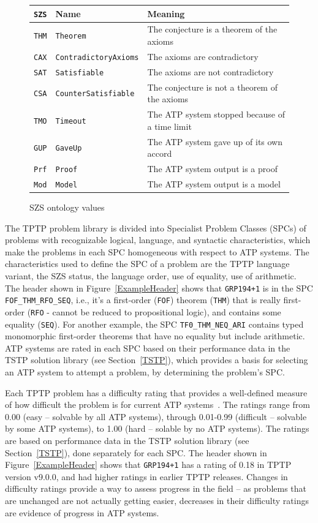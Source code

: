\documentclass[runningheads]{llncs}
\begin{document}
\begin{figure}[htb]
\centering
\begin{tabular}{lll}
{\tt SZS} & Name                      & Meaning \\
\hline
{\tt THM} & {\tt Theorem}             & The conjecture is a theorem of the axioms \\
{\tt CAX} & {\tt ContradictoryAxioms} & The axioms are contradictory \\
{\tt SAT} & {\tt Satisfiable}         & The axioms are not contradictory \\
{\tt CSA} & {\tt CounterSatisfiable}  & The conjecture is not a theorem of the axioms \\
{\tt TMO} & {\tt Timeout}             & The ATP system stopped because of a time limit \\
{\tt GUP} & {\tt GaveUp}              & The ATP system gave up of its own accord \\
{\tt Prf} & {\tt Proof}               & The ATP system output is a proof \\
{\tt Mod} & {\tt Model}               & The ATP system output is a model \\
\end{tabular}
\caption{SZS ontology values}
\label{SZSTable}
\end{figure} 

The TPTP problem library is divided into Specialist Problem Classes (SPCs) of problems with 
recognizable logical, language, and syntactic characteristics, which make the problems in each 
SPC homogeneous with respect to ATP systems.
The characteristics used to define the SPC of a problem are the TPTP language variant, the SZS
status, the language order, use of equality, use of arithmetic.
The header shown in Figure~\ref{ExampleHeader} shows that {\tt GRP194+1} is in the 
SPC {\tt FOF\_THM\_RFO\_SEQ}, i.e., it's a first-order ({\tt FOF}) theorem ({\tt THM}) that
is really first-order ({\tt RFO} - cannot be reduced to propositional logic), and contains some
equality ({\tt SEQ}).
For another example, the SPC {\tt TF0\_THM\_NEQ\_ARI} contains typed monomorphic first-order 
theorems that have no equality but include arithmetic.
ATP systems are rated in each SPC based on their performance data in the TSTP solution library 
(see Section~\ref{TSTP}), which provides a basis for selecting an ATP system to attempt a problem,
by determining the problem's SPC.

Each TPTP problem has a difficulty rating that provides a well-defined measure of how difficult 
the problem is for current ATP systems~\cite{SS01}.
The ratings range from 0.00 (easy -- solvable by all ATP systems), through 0.01-0.99 (difficult -- 
solvable by some ATP systems), to 1.00 (hard -- solable by no ATP systems).
The ratings are based on performance data in the TSTP solution library (see Section~\ref{TSTP}), 
done separately for each SPC.
The header shown in Figure~\ref{ExampleHeader} shows that {\tt GRP194+1} has a rating of 0.18 in
TPTP version v9.0.0, and had higher ratings in earlier TPTP releases.
Changes in difficulty ratings provide a way to assess progress in the field -- as problems that 
are unchanged are not actually getting easier, decreases in their difficulty ratings are evidence 
of progress in ATP systems.
\end{document}
